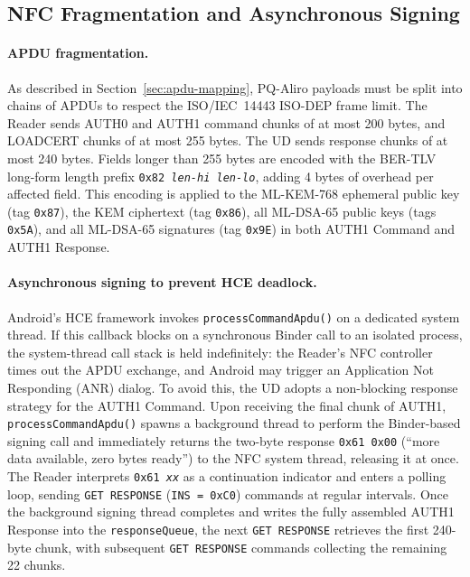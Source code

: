 \documentclass[runningheads]{llncs}
\begin{document}
\subsection{NFC Fragmentation and Asynchronous Signing}
\label{sec:impl:frag}

\paragraph{APDU fragmentation.}
As described in Section~\ref{sec:apdu-mapping}, PQ-Aliro payloads must be
split into chains of APDUs to respect the ISO/IEC~14443 ISO-DEP frame limit.
The Reader sends AUTH0 and AUTH1 command chunks of at most 200 bytes, and
LOADCERT chunks of at most 255 bytes.
The UD sends response chunks of at most 240 bytes.
Fields longer than 255 bytes are encoded with the BER-TLV long-form length
prefix \texttt{0x82\,\textit{len-hi}\,\textit{len-lo}}, adding 4 bytes of
overhead per affected field.
This encoding is applied to the ML-KEM-768 ephemeral public key (tag
\texttt{0x87}), the KEM ciphertext (tag \texttt{0x86}), all ML-DSA-65
public keys (tags \texttt{0x5A}), and all ML-DSA-65 signatures (tag
\texttt{0x9E}) in both AUTH1 Command and AUTH1 Response.

\paragraph{Asynchronous signing to prevent HCE deadlock.}
Android's HCE framework invokes \texttt{processCommandApdu()} on a dedicated
system thread.
If this callback blocks on a synchronous Binder call to an isolated process,
the system-thread call stack is held indefinitely: the Reader's NFC controller
times out the APDU exchange, and Android may trigger an Application Not
Responding (ANR) dialog.
To avoid this, the UD adopts a non-blocking response strategy for the AUTH1
Command.
Upon receiving the final chunk of AUTH1, \texttt{processCommandApdu()} spawns
a background thread to perform the Binder-based signing call and immediately
returns the two-byte response \texttt{0x61\,0x00} (``more data available, zero
bytes ready'') to the NFC system thread, releasing it at once.
The Reader interprets \texttt{0x61\,\textit{xx}} as a continuation indicator
and enters a polling loop, sending \texttt{GET RESPONSE} (\texttt{INS = 0xC0})
commands at regular intervals.
Once the background signing thread completes and writes the fully assembled
AUTH1 Response into the \texttt{responseQueue}, the next \texttt{GET RESPONSE}
retrieves the first 240-byte chunk, with subsequent \texttt{GET RESPONSE}
commands collecting the remaining 22 chunks.
\end{document}
